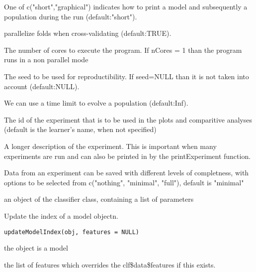 \documentclass[a4paper]{book}
\begin{document}
\begin{Arguments}
\begin{ldescription}
\item[\code{print\_ind\_method:}] One of c("short","graphical") indicates how to print 
a model and subsequently a population during the run (default:"short").

\item[\code{parallelize.folds:}] parallelize folds when cross-validating (default:TRUE).

\item[\code{nCores:}] The number of cores to execute the program. If nCores = 1 than 
the program runs in a non parallel mode

\item[\code{seed:}] The seed to be used for reproductibility. If seed=NULL than it is 
not taken into account (default:NULL).

\item[\code{maxTime:}] We can use a time limit to evolve a population (default:Inf).

\item[\code{experiment.id:}] The id of the experiment that is to be used in the plots 
and comparitive analyses (default is the learner's name, when not specified)

\item[\code{experiment.description:}] A longer description of the experiment. This is 
important when many experiments are run and can also be printed in by the 
printExperiment function.

\item[\code{experiment.save:}] Data from an experiment can be saved with different 
levels of completness, with options to be selected from 
c("nothing", "minimal", "full"), default is "minimal"
\end{ldescription}
\end{Arguments}
%
\begin{Value}
an object of the classifier class, containing a list of parameters
\end{Value}
%
\begin{Description}
Update the index of a model objectn.
\end{Description}
%
\begin{Usage}
\begin{verbatim}
updateModelIndex(obj, features = NULL)
\end{verbatim}
\end{Usage}
%
\begin{Arguments}
\begin{ldescription}
\item[\code{obj:}] the object is a model

\item[\code{features:}] the list of features which overrides the clf\$data\$features if this exists.
\end{ldescription}
\end{Arguments}
\end{document}
